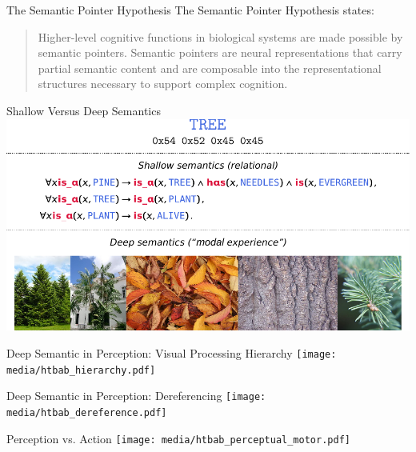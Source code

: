 \documentclass[handout,aspectratio=169]{beamer}
\begin{document}
  \begin{frame}{The Semantic Pointer Hypothesis}
    The Semantic Pointer Hypothesis states: \\ [0.5cm]
    \begin{quote}
    Higher-level cognitive functions in biological systems are made possible by semantic pointers. Semantic pointers are neural representations that carry partial semantic content and are composable into the representational structures necessary to support complex cognition.
    \end{quote}
	\end{frame}


	\begin{frame}{Shallow Versus Deep Semantics}
		\includegraphics[width=\textwidth]{media/shallow_vs_deep_semantics.pdf}
	\end{frame}

	\begin{frame}{Deep Semantic in Perception: Visual Processing Hierarchy}
		\centering
		\texttt{[image: media/htbab\_hierarchy.pdf]}
	\end{frame}

	\begin{frame}{Deep Semantic in Perception: Dereferencing}
		\centering
		\vspace{0.5cm}
		\texttt{[image: media/htbab\_dereference.pdf]}\\
		\vspace{0.0575cm}
	\end{frame}

	\begin{frame}{Perception vs. Action}
		\centering
		\texttt{[image: media/htbab\_perceptual\_motor.pdf]}
	\end{frame}
\end{document}
